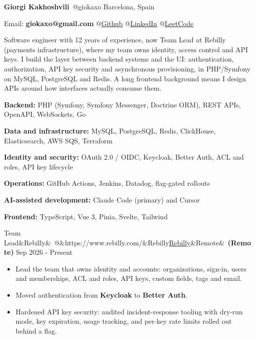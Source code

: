 \documentclass[10pt]{article}
\makeatletter
\newcommand{\weblink}[2]{\href{#1}{\textcolor{linkblue}{\underline{#2}}}}
\newcommand{\resumesection}[1]{\vspace{9pt}{\small\bfseries\textls{\MakeUppercase{#1}}}\par\vspace{3pt}}
\newcommand{\role}[5]{%
  \vspace{5pt}\par\noindent
  {\normalsize #1\ifx&#2&\else\ @\ifx&#3&#2\else\weblink{#3}{#2}\fi\fi\ifx&#4&\else\ \textbf{(#4)}\fi}%
  \hfill{\footnotesize #5}\par\nopagebreak\vspace{1pt}}
\makeatother
\begin{document}
\small

{\Large\bfseries Giorgi Kakhoshvili}\ {\large @giokaxo} \hfill Barcelona, Spain\par
\vspace{3pt}
Email: \textbf{giokaxo@gmail.com} \hfill {\footnotesize
@\weblink{https://github.com/giokaxo}{Github}
@\weblink{https://www.linkedin.com/in/giorgi-kakhoshvili/}{LinkedIn}
@\weblink{https://leetcode.com/u/giokaxo/}{LeetCode}}\par

\resumesection{Summary}
Software engineer with 12 years of experience, now Team Lead at Rebilly (payments infrastructure), where my team owns identity, access control and API keys. I build the layer between backend systems and the UI: authentication, authorization, API key security and asynchronous provisioning, in PHP/Symfony on MySQL, PostgreSQL and Redis. A long frontend background means I design APIs around how interfaces actually consume them.\par

\resumesection{Skills}
\textbf{Backend:} PHP (Symfony, Symfony Messenger, Doctrine ORM), REST APIs, OpenAPI, WebSockets, Go\par
\textbf{Data and infrastructure:} MySQL, PostgreSQL, Redis, ClickHouse, Elasticsearch, AWS SQS, Terraform\par
\textbf{Identity and security:} OAuth 2.0 / OIDC, Keycloak, Better Auth, ACL and roles, API key lifecycle\par
\textbf{Operations:} GitHub Actions, Jenkins, Datadog, flag-gated rollouts\par
\textbf{AI-assisted development:} Claude Code (primary) and Cursor\par
\textbf{Frontend:} TypeScript, Vue 3, Pinia, Svelte, Tailwind\par

\resumesection{Experience}

\role{Team Lead}{Rebilly}{https://www.rebilly.com/}{Remote}{Sep 2026 - Present}
\begin{itemize}
  \item Lead the team that owns identity and accounts: organizations, sign-in, users and memberships, ACL and roles, API keys, custom fields, tags and email.
  \item Moved authentication from \textbf{Keycloak} to \textbf{Better Auth}.
  \item Hardened API key security: audited incident-response tooling with dry-run mode, key expiration, usage tracking, and per-key rate limits rolled out behind a flag.
\end{itemize}
\end{document}
